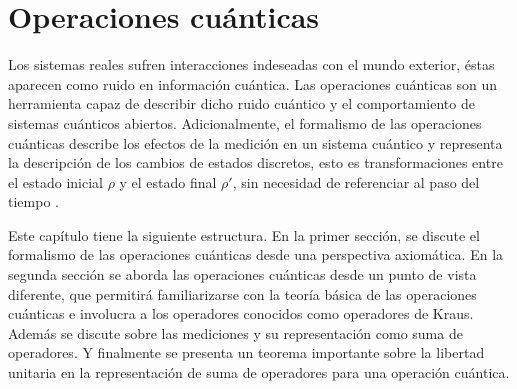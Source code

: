 \chapter{Operaciones cuánticas}\label{OpCuanticas}


Los sistemas reales sufren interacciones indeseadas con el mundo exterior, éstas aparecen como ruido en información cuántica.   
 Las operaciones cuánticas son un herramienta capaz de describir dicho ruido cuántico y el comportamiento de sistemas cuánticos abiertos. %
 Adicionalmente, el formalismo de las operaciones cuánticas describe los efectos de la medición en un sistema cuántico y representa la descripción de los cambios
 de estados discretos, esto es transformaciones entre el estado inicial $\rho$ y el estado final $\rho'$, sin necesidad de referenciar al paso del tiempo {\cite{nielsen_chuang_2010}}. 


Este capítulo tiene la siguiente estructura. En la primer sección, se discute
el formalismo de las operaciones cuánticas desde una perspectiva axiomática. En
la segunda sección se aborda las operaciones cuánticas desde un punto de vista
diferente, que permitirá familiarizarse con la teoría básica de las operaciones
cuánticas e involucra a los operadores conocidos como operadores de Kraus. Además se discute sobre las mediciones y su representación como suma de operadores. Y finalmente se presenta un teorema importante sobre la libertad unitaria en la representación de suma de operadores para una operación cuántica.
